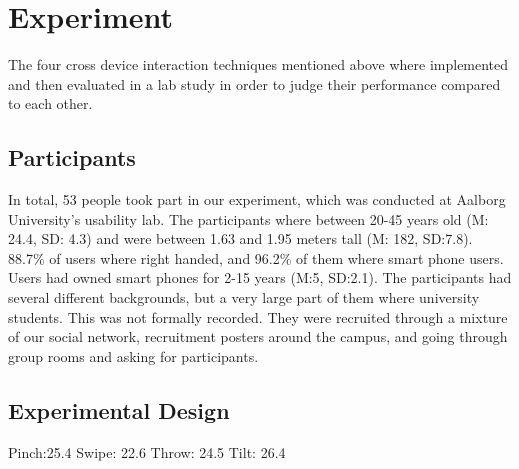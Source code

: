 \section{Experiment}
The four cross device interaction techniques mentioned above where implemented and then evaluated in a lab study in order to judge their performance compared to each other.

\subsection{Participants}
In total, 53 people took part in our experiment, which was conducted at Aalborg University's usability lab. The participants where between 20-45 years old (M: 24.4, SD: 4.3) and were between 1.63 and 1.95 meters tall (M: 182, SD:7.8). 88.7\% of users where right handed, and 96.2\% of them where smart phone users. Users had owned smart phones for 2-15 years (M:5, SD:2.1). The participants had several different backgrounds, but a very large part of them where university students. This was not formally recorded. They were recruited through a mixture of our social network, recruitment posters around the campus, and going through group rooms and asking for participants. 

\subsection{Experimental Design}
Pinch:25.4
Swipe: 22.6
Throw: 24.5
Tilt: 26.4 
